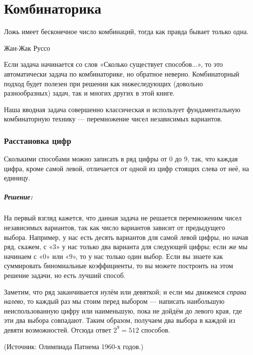 \chapter*{Комбинаторика}

\setlength{\epigraphwidth}{.6\textwidth}
\epigraph{Ложь имеет бесконечное число комбинаций,
тогда как правда бывает только одна.}{Жан-Жак Руссо}

 
 
Если задача начинается со слов «Сколько существует способов...», то это автоматически задача по комбинаторике, но обратное неверно.
Комбинаторный подход будет полезен при решении как нижеследующих (довольно разнообразных) задач, так и многих других в этой книге.

Наша вводная задача совершенно классическая и использует фундаментальную
комбинаторную технику --- перемножение чисел независимых вариантов.

\subsection*{Расстановка цифр}%

Сколькими способами можно записать в ряд цифры от 0 до 9, так, что каждая цифра, кроме самой левой, отличается от одной из цифр стоящих слева от неё, на единицу.

\paragraph{Решение:} На первый взгляд кажется, что данная задача не решается перемноженим чисел независимых вариантов, так как число вариантов зависит от предыдущего выбора.
Например, у нас есть десять вариантов для самой левой цифры,
но начав ряд, скажем, с «3» у нас только два варианта для следующей цифры; если же мы начинаем с «0» или «9», то у нас только один выбор.
Если вы знаете как суммировать биномиальные коэффициенты, то вы можете построить на этом решение задачи, но есть лучший способ.

Заметим, что ряд заканчивается нулём или девяткой; и если мы движемся \emph{справа налево}, то каждый раз мы стоим перед выбором --- написать наибольшую неиспользованную цифру или наименьшую, пока не дойдём до левого края, где эти два выбора совпадают.
Таким образом, получаем два выбора в каждой из девяти возможностей.
Отсюда ответ $2^9=512$ способов.\heart

(Источник: Олимпиада Патнема 1960-х годов.)%

